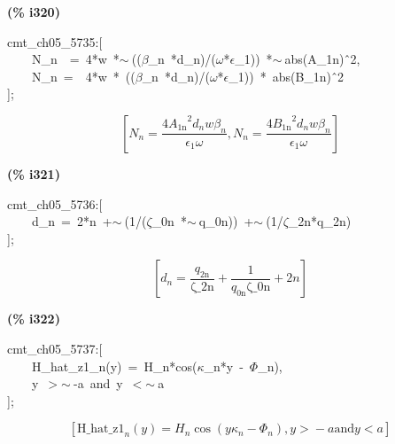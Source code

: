 \documentclass[fleqn]{article}
\begin{document}
\noindent
\begin{minipage}[t]{4.000000em}\color{red}\bfseries
(\% i320)	
\end{minipage}
\begin{minipage}[t]{\textwidth}\color{blue}
cmt\_ch05\_5735:[\\
\ \ \ \ N\_n\ \ =\ 4*w\ *\ensuremath{\sim\ }((\ensuremath{\beta}\_n\ *d\_n)/(\ensuremath{\omega}*\ensuremath{\epsilon}\_1))\ *\ensuremath{\sim\ }abs(A\_1n)\^\ 2,\\
\ \ \ \ N\_n\ =\ \ 4*w\ *\ ((\ensuremath{\beta}\_n\ *d\_n)/(\ensuremath{\omega}*\ensuremath{\epsilon}\_1))\ *\ abs(B\_1n)\^\ 2\\
];
\end{minipage}
\[\displaystyle \tag{\% o320} 
\left[ {N_n}=\frac{4 {{{A_{\ensuremath{\mathrm{1n}}}}}^{2}} {d_n} w {{\beta }_n}}{{{\epsilon }_1} \omega }\operatorname{,}{N_n}=\frac{4 {{{B_{\ensuremath{\mathrm{1n}}}}}^{2}} {d_n} w {{\beta }_n}}{{{\epsilon }_1} \omega }\right] \mbox{}
\]


\noindent
\begin{minipage}[t]{4.000000em}\color{red}\bfseries
(\% i321)	
\end{minipage}
\begin{minipage}[t]{\textwidth}\color{blue}
cmt\_ch05\_5736:[\\
\ \ \ \ d\_n\ =\ 2*n\ +\ensuremath{\sim\ }(1/(\ensuremath{\zeta}\_0n\ *\ensuremath{\sim\ }q\_0n))\ +\ensuremath{\sim\ }(1/\ensuremath{\zeta}\_2n*q\_2n)\\
];
\end{minipage}
\[\displaystyle \tag{\% o321} 
\left[ {d_n}=\frac{{q_{\ensuremath{\mathrm{2n}}}}}{\ensuremath{\mathrm{\zeta \_ 2n}}}+\frac{1}{{q_{\ensuremath{\mathrm{0n}}}} \ensuremath{\mathrm{\zeta \_ 0n}}}+2 n\right] \mbox{}
\]


\noindent
\begin{minipage}[t]{4.000000em}\color{red}\bfseries
(\% i322)	
\end{minipage}
\begin{minipage}[t]{\textwidth}\color{blue}
cmt\_ch05\_5737:[\\
\ \ \ \ H\_hat\_z1\_n(y)\ =\ H\_n*cos(\ensuremath{\kappa}\_n*y\ -\ \ensuremath{\Phi}\_n),\\
\ \ \ \ y\ \ensuremath{>}\ensuremath{\sim\ }-a\ and\ y\ \ensuremath{<}\ensuremath{\sim\ }a\\
];
\end{minipage}
\[\displaystyle \tag{\% o322} 
\left[ {{\ensuremath{\mathrm{H\_ hat\_ z1}}}_n}(y)={H_n} \cos{\left( y {{\kappa }_n}-{{\Phi }_n}\right) }\operatorname{,}y\operatorname{>  }-a\ensuremath{\mathrm{ and }}y\operatorname{<  }a\right] \mbox{}
\]
\end{document}
